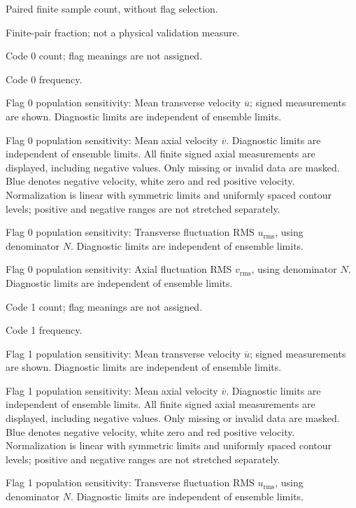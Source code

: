 \caption{Paired finite sample count, without flag selection.}

\caption{Finite-pair fraction; not a physical validation measure.}

\caption{Code 0 count; flag meanings are not assigned.}

\caption{Code 0 frequency.}

\caption{Flag 0 population sensitivity: Mean transverse velocity $\overline{u}$; signed measurements are shown. Diagnostic limits are independent of ensemble limits.}

\caption{Flag 0 population sensitivity: Mean axial velocity $\overline{v}$. Diagnostic limits are independent of ensemble limits. All finite signed axial measurements are displayed, including negative values. Only missing or invalid data are masked. Blue denotes negative velocity, white zero and red positive velocity. Normalization is linear with symmetric limits and uniformly spaced contour levels; positive and negative ranges are not stretched separately.}

\caption{Flag 0 population sensitivity: Transverse fluctuation RMS $u_{\mathrm{rms}}$, using denominator $N$. Diagnostic limits are independent of ensemble limits.}

\caption{Flag 0 population sensitivity: Axial fluctuation RMS $v_{\mathrm{rms}}$, using denominator $N$. Diagnostic limits are independent of ensemble limits.}

\caption{Code 1 count; flag meanings are not assigned.}

\caption{Code 1 frequency.}

\caption{Flag 1 population sensitivity: Mean transverse velocity $\overline{u}$; signed measurements are shown. Diagnostic limits are independent of ensemble limits.}

\caption{Flag 1 population sensitivity: Mean axial velocity $\overline{v}$. Diagnostic limits are independent of ensemble limits. All finite signed axial measurements are displayed, including negative values. Only missing or invalid data are masked. Blue denotes negative velocity, white zero and red positive velocity. Normalization is linear with symmetric limits and uniformly spaced contour levels; positive and negative ranges are not stretched separately.}

\caption{Flag 1 population sensitivity: Transverse fluctuation RMS $u_{\mathrm{rms}}$, using denominator $N$. Diagnostic limits are independent of ensemble limits.}


